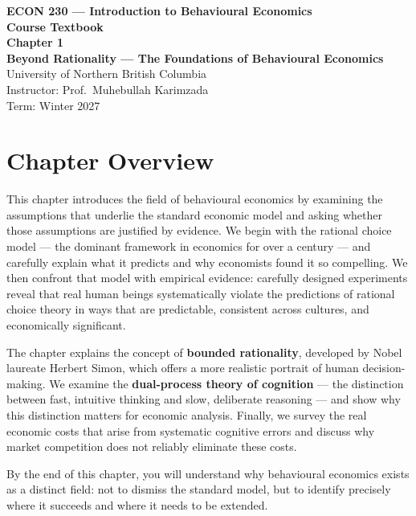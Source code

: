 \documentclass[12pt, letterpaper]{article}
\begin{document}
\begin{titlepage}
\centering\vspace*{3cm}
{\Large\bfseries\color{econblue} ECON 230 --- Introduction to Behavioural Economics\\[1em]}
{\large\bfseries Course Textbook\\[2em]}
{\LARGE\bfseries\color{econblue} Chapter 1\\[0.5em]}
{\Large\bfseries Beyond Rationality --- The Foundations of Behavioural Economics\\[2em]}
\vfill
{\normalsize University of Northern British Columbia\\
Instructor: Prof.\ Muhebullah Karimzada\\
Term: Winter 2027}
\end{titlepage}
\tableofcontents
\newpage


\medskip


\section*{Chapter Overview}


This chapter introduces the field of behavioural economics by examining the assumptions that underlie the standard economic model and asking whether those assumptions are justified by evidence. We begin with the rational choice model --- the dominant framework in economics for over a century --- and carefully explain what it predicts and why economists found it so compelling. We then confront that model with empirical evidence: carefully designed experiments reveal that real human beings systematically violate the predictions of rational choice theory in ways that are predictable, consistent across cultures, and economically significant.

The chapter explains the concept of \textbf{bounded rationality}, developed by Nobel laureate Herbert Simon, which offers a more realistic portrait of human decision-making. We examine the \textbf{dual-process theory of cognition} --- the distinction between fast, intuitive thinking and slow, deliberate reasoning --- and show why this distinction matters for economic analysis. Finally, we survey the real economic costs that arise from systematic cognitive errors and discuss why market competition does not reliably eliminate these costs.

By the end of this chapter, you will understand why behavioural economics exists as a distinct field: not to dismiss the standard model, but to identify precisely where it succeeds and where it needs to be extended.
\end{document}

